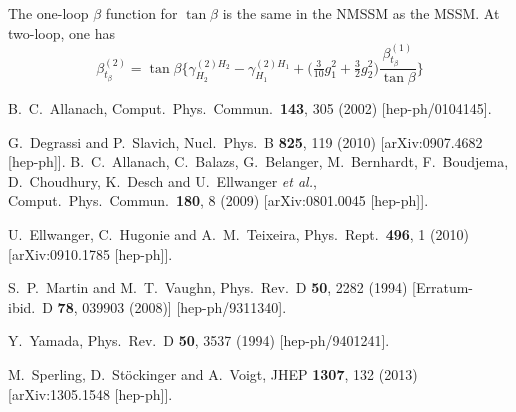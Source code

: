 \documentclass[final,3p,times,pdflatex]{elsarticle}
\newcommand{\be}{\begin{equation}}
\newcommand{\ee}{\end{equation}}
\begin{document}
The one-loop $\beta$ function for $\tan\beta$ is the same in the NMSSM as the MSSM.  At two-loop, one has
%
\be
\beta^{(2)}_{t_\beta} = \tan\beta\Bigg\{\gamma^{(2)H_2}_{H_2} - 
\gamma^{(2)H_1}_{H_1} + \Big(\tfrac{3}{10}g_1^2 + \tfrac{3}{2}g_2^2\Big)
\frac{\beta^{(1)}_{t_\beta}}{\tan\beta}\Bigg\}
\ee


\begin{thebibliography}{10}
  B.~C.~Allanach,
  Comput.\ Phys.\ Commun.\  {\bf 143}, 305 (2002)
  [hep-ph/0104145].

  G.~Degrassi and P.~Slavich,
  Nucl.\ Phys.\ B {\bf 825}, 119 (2010)
  [arXiv:0907.4682 [hep-ph]].
  B.~C.~Allanach, C.~Balazs, G.~Belanger, M.~Bernhardt, F.~Boudjema, D.~Choudhury, K.~Desch and U.~Ellwanger {\it et al.},
  Comput.\ Phys.\ Commun.\  {\bf 180}, 8 (2009)
  [arXiv:0801.0045 [hep-ph]].

  U.~Ellwanger, C.~Hugonie and A.~M.~Teixeira,
  Phys.\ Rept.\  {\bf 496}, 1 (2010)
  [arXiv:0910.1785 [hep-ph]].

  S.~P.~Martin and M.~T.~Vaughn,
  Phys.\ Rev.\ D {\bf 50}, 2282 (1994)
  [Erratum-ibid.\ D {\bf 78}, 039903 (2008)]
  [hep-ph/9311340].

  Y.~Yamada,
  Phys.\ Rev.\ D {\bf 50}, 3537 (1994)
  [hep-ph/9401241].

\cite{Sper13}
  M.~Sperling, D.~Stöckinger and A.~Voigt,
  JHEP {\bf 1307}, 132 (2013)
  [arXiv:1305.1548 [hep-ph]].


\end{thebibliography}
\end{document}
